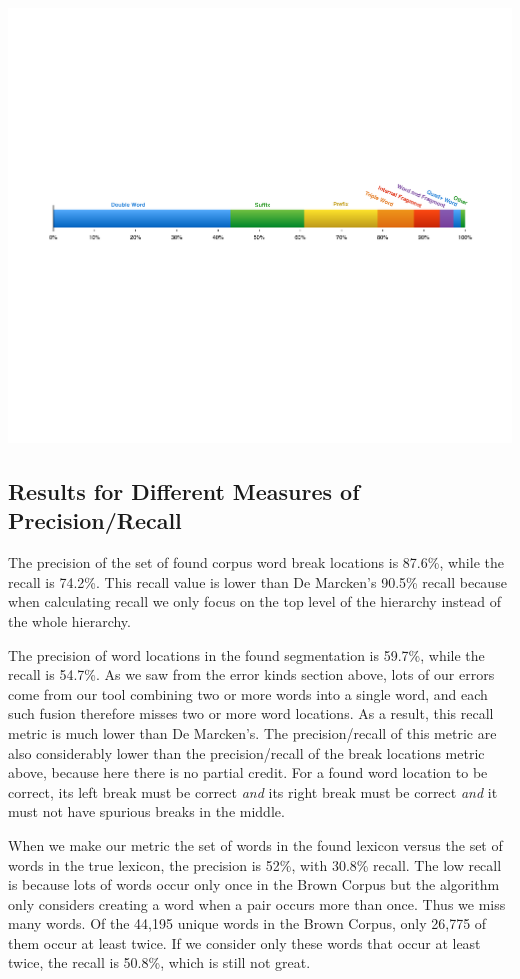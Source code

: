 \documentclass[11pt, oneside, fleqn]{article}
\begin{document}
  \includegraphics[scale=0.55]{./figure/error_nature_classfier.pdf}

  \subsection{Results for Different Measures of Precision/Recall}
  
  The precision of the set of found corpus word break locations is 87.6\%, while the recall is 74.2\%. This recall value is lower than De Marcken's 90.5\% recall because when calculating recall we only focus on the top level of the hierarchy instead of the whole hierarchy.

  The precision of word locations in the found segmentation is 59.7\%, while the recall is 54.7\%. As we saw from the error kinds section above, lots of our errors come from our tool combining two or more words into a single word, and each such fusion therefore misses two or more word locations. As a result, this recall metric is much lower than De Marcken's. The precision/recall of this metric are also considerably lower than the precision/recall of the break locations metric above, because here there is no partial credit. For a found word location to be correct, its left break must be correct \textit{and} its right break must be correct \textit{and} it must not have spurious breaks in the middle.
  
  When we make our metric the set of words in the found lexicon versus the set of words in the true lexicon, the precision is 52\%, with 30.8\% recall. The low recall is because lots of words occur only once in the Brown Corpus but the algorithm only considers creating a word when a pair occurs more than once. Thus we miss many words. Of the 44,195 unique words in the Brown Corpus, only 26,775 of them occur at least twice. If we consider only these words that occur at least twice, the recall is 50.8\%, which is still not great.
\end{document}
